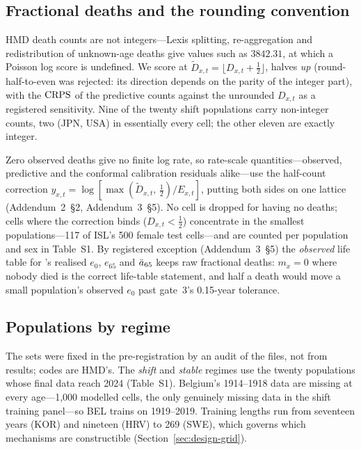 \subsection{Fractional deaths and the rounding convention}
\label{sec:data-rounding}

HMD death counts are not integers---Lexis splitting, re-aggregation and
redistribution of unknown-age deaths give values such as $3842.31$, at which
a Poisson log score is undefined. We score at $\tilde D_{x,t} =
\lfloor D_{x,t} + \tfrac12 \rfloor$, halves \emph{up} (round-half-to-even was
rejected: its direction depends on the parity of the integer part), with the
$\operatorname{CRPS}$ of the predictive counts against the unrounded $D_{x,t}$ as a
registered sensitivity. Nine of the twenty shift populations carry
non-integer counts, two (JPN, USA) in essentially every cell; the other
eleven are exactly integer.

Zero observed deaths give no finite log rate, so rate-scale
quantities---observed, predictive and the conformal calibration residuals
alike---use the half-count correction $y_{x,t} = \log[\max(\tilde
D_{x,t},\,\tfrac12)/E_{x,t}]$, putting both sides on one lattice
(Addendum~2~\S2, Addendum~3~\S5). No cell is dropped for having no deaths;
cells where the correction binds ($D_{x,t}<\tfrac12$) concentrate in the
smallest populations---117 of ISL's 500 female test cells---and are counted
per population and sex in Table~S1. By registered exception
(Addendum~3~\S5) the \emph{observed} life table for \Hfive's realised $e_0$,
$e_{65}$ and $\ddot{a}_{65}$ keeps raw fractional deaths: $m_x=0$ where nobody
died is the correct life-table statement, and half a death would move a small
population's observed $e_0$ past gate~3's 0.15-year tolerance.

\subsection{Populations by regime}

The sets were fixed in the pre-registration by an audit of the files, not
from results; codes are HMD's. The \emph{shift} and \emph{stable} regimes use
the twenty populations whose final data reach 2024 (Table~S1). Belgium's
1914--1918 data are missing at every age---1{,}000 modelled cells, the only
genuinely missing data in the shift training panel---so BEL trains on
1919--2019. Training lengths run from seventeen years (KOR) and nineteen
(HRV) to 269 (SWE), which governs which mechanisms are constructible
(Section~\ref{sec:design-grid}).

